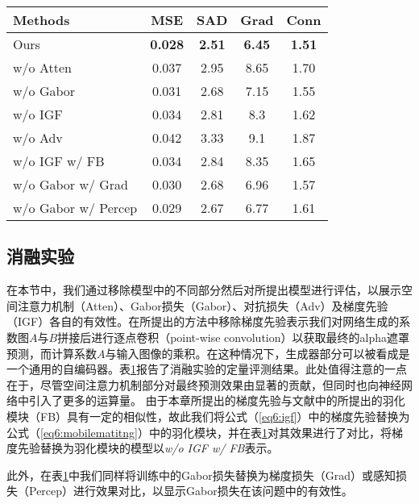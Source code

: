\begin{table}[t]
	\setlength{\tabcolsep}{8pt}
	\centering
	\begin{tabular}{lcccc}
		\toprule
		Methods & MSE & SAD & Grad &Conn\\
		\midrule
		Ours & \textbf{0.028} & \textbf{2.51} & \textbf{6.45} & \textbf{1.51}\\    
		w/o Atten & 0.037 & 2.95& 8.65 & 1.70\\
		w/o Gabor & 0.031 & 2.68 & 7.15 & 1.55\\
		w/o IGF & 0.034 & 2.81 & 8.3 & 1.62\\
		w/o Adv & 0.042 & 3.33 & 9.1 & 1.87\\
		w/o IGF w/ FB  & 0.034 & 2.84 & 8.35 & 1.65\\
		w/o Gabor w/ Grad & 0.030 & 2.68 & 6.96 & 1.57\\
		w/o Gabor w/ Percep & 0.029 & 2.67 & 6.77 & 1.61\\
		\bottomrule
	\end{tabular}
	\label{tab6:ablation}
\end{table}
\subsection{消融实验}
在本节中，我们通过移除模型中的不同部分然后对所提出模型进行评估，以展示空间注意力机制（Atten）、Gabor损失（Gabor）、对抗损失（Adv）及梯度先验（IGF）各自的有效性。在所提出的方法中移除梯度先验表示我们对网络生成的系数图$A$与$B$拼接后进行逐点卷积（point-wise convolution）以获取最终的alpha遮罩预测，而计算系数$A$与输入图像的乘积。在这种情况下，生成器部分可以被看成是一个通用的自编码器。表\ref{tab6:ablation}报告了消融实验的定量评测结果。此处值得注意的一点在于，尽管空间注意力机制部分对最终预测效果由显著的贡献，但同时也向神经网络中引入了更多的运算量。
由于本章所提出的梯度先验与文献\parencite{zhu2017fast}中的所提出的羽化模块（FB）具有一定的相似性，故此我们将公式（\ref{eq6:igf}）中的梯度先验替换为公式（\ref{eq6:mobilematitng}）中的羽化模块，并在表\ref{tab6:ablation}对其效果进行了对比，将梯度先验替换为羽化模块的模型以\textit{w/o IGF w/ FB}表示。

此外，在表\ref{tab6:ablation}中我们同样将训练中的Gabor损失替换为梯度损失（Grad）或感知损失（Percep）进行效果对比，以显示Gabor损失在该问题中的有效性。

